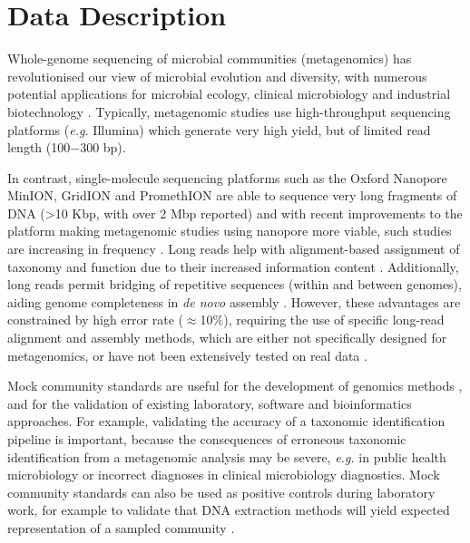 \documentclass[a4paper,num-refs]{oup-contemporary}
\begin{document}

\section{Data Description}

Whole-genome sequencing of microbial communities (metagenomics) has revolutionised our view of microbial evolution and diversity, with numerous potential applications for microbial ecology, clinical microbiology and industrial biotechnology \cite{Handelsman2004-lg,Hug2016-wz}.
Typically, metagenomic studies use high-throughput sequencing platforms (\textit{e.g.} Illumina) \cite{Quince2017-lf} which generate very high yield, but of limited read length (100$-$300 bp).

In contrast, single-molecule sequencing platforms such as the Oxford Nanopore MinION, GridION and PromethION are able to sequence very long fragments of DNA (>10 Kbp, with over 2 Mbp reported) \cite{Jain2018-aw,Payne2018-cv} and with recent improvements to the platform making metagenomic studies using nanopore more viable, such studies are increasing in frequency \cite{Sanderson2018-zf,Charalampous2018-fl,Somerville2018-mq,Leggett2017-sx}. 
Long reads help with alignment-based assignment of taxonomy and function due to their increased information content \cite{Huson2007-mk,Wommack2008-qf}. 
Additionally, long reads permit bridging of repetitive sequences (within and between genomes), aiding genome completeness in \textit{de novo} assembly \cite{Bertrand2018-lz}.
However, these advantages are constrained by high error rate ($\approx$10\%), requiring the use of specific long-read alignment and assembly methods, which are either not specifically designed for metagenomics, or have not been extensively tested on real data \cite{sczyrba2017critical}.

Mock community standards are useful for the development of genomics methods \cite{Mason2017-yj}, and for the validation of existing laboratory, software and bioinformatics approaches. For example, validating the accuracy of a taxonomic identification pipeline is important, because the consequences of erroneous taxonomic identification from a metagenomic analysis may be severe, \textit{e.g.} in public health microbiology \cite{Ackelsberg2015-fh,mcintyre2017comprehensive} or incorrect diagnoses in clinical microbiology diagnostics. Mock community standards can also be used as positive controls during laboratory work, for example to validate that DNA extraction methods will yield expected representation of a sampled community \cite{Mason2017-yj}. 
\end{document}
